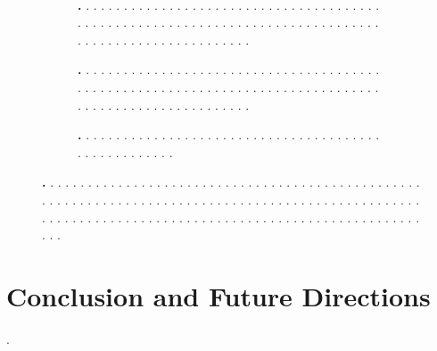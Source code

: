 \documentclass[letterpaper,10pt,conference,twoside]{IEEEtran}
\theoremstyle{definition}
\begin{document}
~
\newpage

\begin{figure}[t!]
  \centering
  \vspace*{-.3cm}
  \begin{subfigure}[t]{\linewidth}
  \hspace*{-.15cm}
  \caption{\textbf{.   }.   .   .   .   .   .   .   .   .   .   .   .   .   .   .   .   .   .   .   .   .   .   .   .   .   .   .   .   .   .   .   .   .   .   .   .   .   .   .   .   .   .   .   .   .   .   .   .   .   .   .   .   .   .   .   .   .   .   .   .   .   .   .   .   .   .   .   .   .   .   .   .   .   .   .   .   .   .   .   .   .   .   .   .   .   .   .   .   .   .   .   .   .   .   .   .   .   .   .   .   .   .}
  \label{fig:1-1}
  \end{subfigure}
  \begin{subfigure}[t]{\linewidth}
  \hspace*{-.15cm}
  \caption{\textbf{.   }.   .   .   .   .   .   .   .   .   .   .   .   .   .   .   .   .   .   .   .   .   .   .   .   .   .   .   .   .   .   .   .   .   .   .   .   .   .   .   .   .   .   .   .   .   .   .   .   .   .   .   .   .   .   .   .   .   .   .   .   .   .   .   .   .   .   .   .   .   .   .   .   .   .   .   .   .   .   .   .   .   .   .   .   .   .   .   .   .   .   .   .   .   .   .   .   .   .   .   .   .   .}
  \label{fig:1-2}
  \end{subfigure}
  \begin{subfigure}[t]{\linewidth}
  \hspace*{-.15cm}
  \caption{\textbf{.   }.   .   .   .   .   .   .   .   .   .   .   .   .   .   .   .   .   .   .   .   .   .   .   .   .   .   .   .   .   .   .   .   .   .   .   .   .   .   .   .   .   .   .   .   .   .   .   .   .   .   .   .}
  \label{fig:1-3}
  \end{subfigure}
  \caption[.]{\textbf{.   }.   .   .   .   .   .   .   .   .   .   .   .   .   .   .   .   .   .   .   .   .   .   .   .   .   .   .   .   .   .   .   .   .   .   .   .   .   .   .   .   .   .   .   .   .   .   .   .   .   .   .   .   .   .   .   .   .   .   .   .   .   .   .   .   .   .   .   .   .   .   .   .   .   .   .   .   .   .   .   .   .   .   .   .   .   .   .   .   .   .   .   .   .   .   .   .   .   .   .   .   .   .   .   .   .   .   .   .   .   .   .   .   .   .   .   .   .   .   .   .   .   .   .   .   .   .   .   .   .   .   .   .   .   .   .   .   .   .   .   .   .   .   .   .   .   .   .   .   .   .   .   .}
  \label{fig:1}
\end{figure}




\section{Conclusion and Future Directions}\label{sec:conc}
\noindent
.

{\small
 

}
\end{document}
